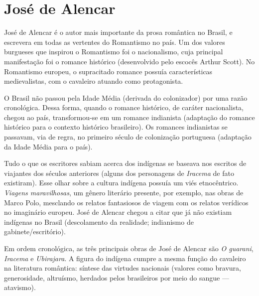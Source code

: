 \documentclass[12pt]{book}
\begin{document}
			\section{José de Alencar}
			\par José de Alencar é o autor mais importante da prosa romântica no Brasil, e escrevera em todas as vertentes do Romantismo no país. Um dos valores burgueses que inspirou o Romantismo foi o nacionalismo, cuja principal manifestação foi o romance histórico (desenvolvido pelo escocês Arthur Scott). No Romantismo europeu, o supracitado romance possuía características medievalistas, com o cavaleiro atuando como protagonista.
			\par O Brasil não passou pela Idade Média (derivada do colonizador) por uma razão cronológica. Dessa forma, quando o romance histórico, de caráter nacionalista, chegou ao país, transformou-se em um romance indianista (adaptação do romance histórico para o contexto histórico brasileiro). Os romances indianistas se passavam, via de regra, no primeiro século de colonização portuguesa (adaptação da Idade Média para o país).
			\par Tudo o que os escritores sabiam acerca dos indígenas se baseava nos escritos de viajantes dos séculos anteriores (alguns dos personagens de \textit{Iracema} de fato existiram). Esse olhar sobre a cultura indígena possuía um viés etnocêntrico. \textit{Viagens maravilhosas}, um gênero literário presente, por exemplo, nas obras de Marco Polo, mesclando os relatos fantasiosos de viagem com os relatos verídicos no imaginário europeu. José de Alencar chegou a citar que já não existiam indígenas no Brasil (descolamento da realidade; indianismo de gabinete/escritório).
			\par Em ordem cronológica, as três principais obras de José de Alencar são \textit{O guarani}, \textit{Iracema} e \textit{Ubirajara}. A figura do indígena cumpre a mesma função do cavaleiro na literatura romântica: síntese das virtudes nacionais (valores como bravura, generosidade, altruísmo, herdados pelos brasileiros por meio do sangue — atavismo).
\end{document}
